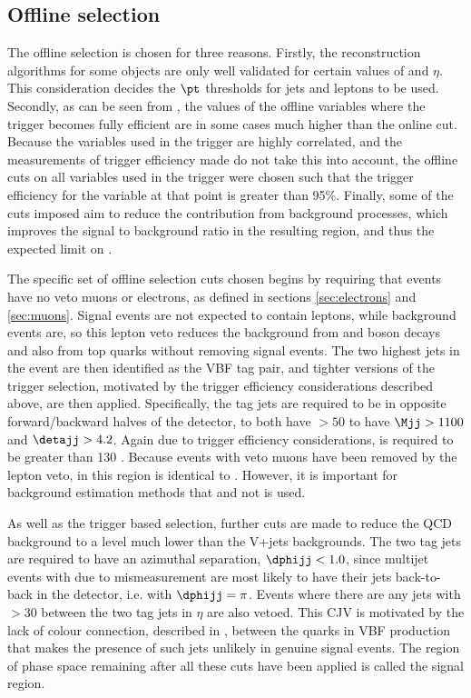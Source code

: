 \subsection{Offline selection}
\label{sec:promptofflinesel}
The offline selection is chosen for three reasons. Firstly, the reconstruction algorithms for some objects are only well validated for certain values of \pt and $\eta$. This consideration decides the $\pt$ thresholds for jets and leptons to be used. Secondly, as can be seen from , the values of the offline variables where the trigger becomes fully efficient are in some cases much higher than the online cut. Because the variables used in the trigger are highly correlated, and the measurements of trigger efficiency made do not take this into account, the offline cuts on all variables used in the trigger were chosen such that the trigger efficiency for the variable at that point is greater than 95\%. Finally, some of the cuts imposed aim to reduce the contribution from background processes, which improves the signal to background ratio in the resulting region, and thus the expected limit on \BRinv.

The specific set of offline selection cuts chosen begins by requiring that events have no veto muons or electrons, as defined in sections \ref{sec:electrons} and \ref{sec:muons}. Signal events are not expected to contain leptons, while background events are, so this lepton veto reduces the background from \PW and \PZ boson decays and also from top quarks without removing signal events. The two highest \pt jets in the event are then identified as the VBF tag pair, and tighter versions of the trigger selection, motivated by the trigger efficiency considerations described above, are then applied. Specifically, the tag jets are required to be in opposite forward/backward halves of the detector, to both have \pt$>50$ \GeV to have $\Mjj>1100$ \GeV and $\detajj>4.2$. Again due to trigger efficiency considerations, \METnoMU is required to be greater than 130 \GeV.  Because events with veto muons have been removed by the lepton veto, \METnoMU in this region is identical to \MET. However, it is important for background estimation methods that \METnoMU and not \MET is used.

As well as the trigger based selection, further cuts are made to reduce the \ac{QCD} background to a level much lower than the V+jets backgrounds. The two tag jets are required to have an azimuthal separation, $\dphijj<1.0$, since multijet events with \MET due to mismeasurement are most likely to have their jets back-to-back in the detector, i.e. with $\dphijj=\pi$. Events where there are any jets with \pt$>30$ \GeV between the two tag jets in $\eta$ are also vetoed. This \ac{CJV} is motivated by the lack of colour connection, described in , between the quarks in VBF production that makes the presence of such jets unlikely in genuine signal events. The region of phase space remaining after all these cuts have been applied is called the signal region.

